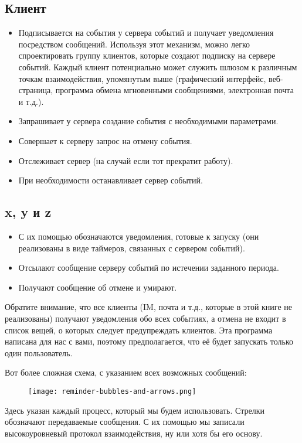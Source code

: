 \subsection{Клиент}
\label{client}
\begin{itemize}
\item Подписывается на события у сервера событий и получает уведомления посредством сообщений.
Используя этот механизм, можно легко спроектировать группу клиентов, которые создают подписку на сервере событий.
Каждый клиент потенциально может служить шлюзом к различным точкам взаимодействия, упомянутым выше (графический интерфейс, веб\--страница, программа обмена мгновенными сообщениями, электронная почта и т.д.).
\item Запрашивает у сервера создание события с необходимыми параметрами.
\item Совершает к серверу запрос на отмену события.
\item Отслеживает сервер (на случай если тот прекратит работу).
\item При необходимости останавливает сервер событий.
\end{itemize}
\subsection{x, y и z}
\label{x-y-and-z}
\begin{itemize}
\item С их помощью обозначаются уведомления, готовые к запуску (они реализованы в виде таймеров, связанных с сервером событий).
\item Отсылают сообщение серверу событий по истечении заданного периода.
\item Получают сообщение об отмене и умирают.
\end{itemize}

Обратите внимание, что все клиенты (IM, почта и т.д., которые в этой книге не реализованы) получают уведомления обо всех событиях, а отмена не входит в список вещей, о которых следует предупреждать клиентов.
Эта программа написана для нас с вами, поэтому предполагается, что её будет запускать только один пользователь.

Вот более сложная схема, с указанием всех возможных сообщений:
\begin{figure}[h!]
    \centering
    \texttt{[image: reminder-bubbles-and-arrows.png]}
\end{figure}

Здесь указан каждый процесс, который мы будем использовать.
Стрелки обозначают передаваемые сообщения.
С их помощью мы записали высокоуровневый протокол взаимодействия, ну или хотя бы его основу.

